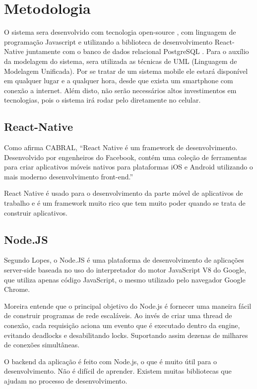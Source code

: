 \chapter{Metodologia}
O sistema sera desenvolvido com tecnologia open-source , com linguagem de programação Javascript e utilizando a biblioteca de desenvolvimento React-Native  juntamente com o banco de dados relacional PostgreSQL . Para o auxílio da modelagem do sistema, sera utilizada as técnicas de UML (Linguagem de Modelagem Unificada). Por se tratar de um sistema mobile ele estará disponível em qualquer lugar e a qualquer hora, desde que exista um smartphone com conexão a internet. Além disto, não serão necessários altos investimentos em tecnologias, pois o sistema irá rodar pelo diretamente no celular.

\section{React-Native}
Como afirma CABRAL, “React Native  é um framework de desenvolvimento.
Desenvolvido por engenheiros do Facebook, contém uma coleção de ferramentas para criar aplicativos móveis nativos para plataformas iOS e Android utilizando o mais moderno desenvolvimento front-end.”

React Native é usado para o desenvolvimento da parte móvel de aplicativos de trabalho e é um framework muito rico que tem muito poder quando se trata de construir aplicativos.

\section{Node.JS}
Segundo Lopes, o Node.JS \cite{nodejs} é uma plataforma de desenvolvimento de aplicações server-side baseada no uso do interpretador do motor JavaScript V8 do Google, que utiliza apenas código JavaScript, o mesmo utilizado pelo navegador Google Chrome.

Moreira  entende que o principal objetivo do Node.js é fornecer uma maneira fácil de construir programas de rede escaláveis. Ao invés de criar uma thread de conexão, cada requisição aciona um evento que é executado dentro da engine, evitando deadlocks e desabilitando locks. Suportando assim dezenas de milhares de conexões simultâneas. 

O backend da aplicação é feito com Node.js, o que é muito útil para o desenvolvimento. Não é difícil de aprender. Existem muitas bibliotecas que ajudam no processo de desenvolvimento.
